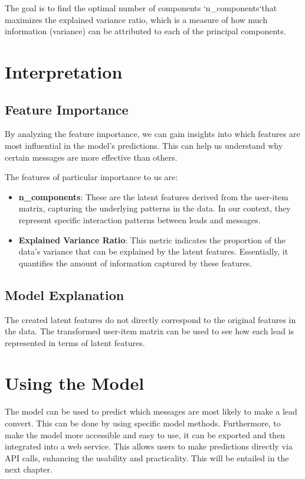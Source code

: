 The goal is to find the optimal number of components `n\_components`that maximizes the explained variance ratio, which is a measure of how much information (variance) can be attributed to each of the principal components.

\section{Interpretation}

\subsection{Feature Importance}
By analyzing the feature importance, we can gain insights into which features are most influential in the model's predictions. This can help us understand why certain messages are more effective than others.

The features of particular importance to us are:
\begin{itemize}
    \item \textbf{n\_components}: These are the latent features derived from the user-item matrix, capturing the underlying patterns in the data. In our context, they represent specific interaction patterns between leads and messages.
    \item \textbf{Explained Variance Ratio}: This metric indicates the proportion of the data's variance that can be explained by the latent features. Essentially, it quantifies the amount of information captured by these features.
\end{itemize}

\subsection{Model Explanation}
The created latent features do not directly correspond to the original features in the data. The transformed user-item matrix can be used to see how each lead is represented in terms of latent features.

\section{Using the Model}
The model can be used to predict which messages are most likely to make a lead convert.
This can be done by using specific model methods.
Furthermore, to make the model more accessible and easy to use, it can be exported and then integrated into a web service.
This allows users to make predictions directly via API calls, enhancing the usability and practicality.
This will be entailed in the next chapter.


